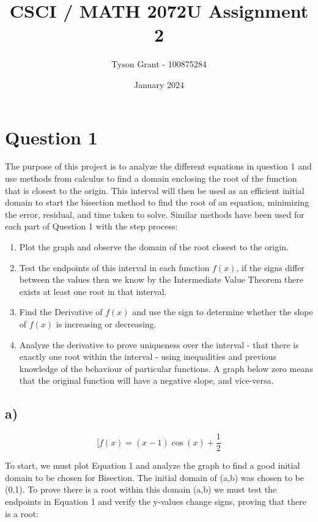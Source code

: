 \documentclass{article}
\title{CSCI / MATH 2072U Assignment 2}
\author{Tyson Grant - 100875284}
\date{January 2024}
\begin{document}
\maketitle

\newpage

\section*{Question 1}
    The purpose of this project is to analyze the different equations in question 1 and use methods from calculus to find a domain enclosing the root of the function that is closest to the origin.  This interval will then be used as an efficient initial domain to start the bisection method to find the root of an equation, minimizing the error, residual, and time taken to solve.  Similar methods have been used for each part of Question 1 with the step process: 
    
    \begin{enumerate}
        \item Plot the graph and observe the domain of the root closest to the origin.
        \item Test the endpoints of this interval in each function $f(x)$, if the signs differ between the values then we know by the Intermediate Value Theorem there exists at least one root in that interval.
        \item Find the Derivative of $f(x)$ and use the sign to determine whether the slope of $f(x)$ is increasing or decreasing.
        \item Analyze the derivative to prove uniqueness over the interval - that there is exactly one root within the interval - using inequalities and previous knowledge of the behaviour of particular functions.  A graph below zero means that the original function will have a negative slope, and vice-versa.
    \end{enumerate}

    
\subsection*{a)}
    \begin{equation}
        [ f(x) = (x-1)\cos(x)+\frac{1}{2}
    \end{equation}

    To start, we must plot Equation 1 and analyze the graph to find a good initial domain to be chosen for Bisection.  The initial domain of (a,b) was chosen to be (0,1). To prove there is a root within this domain (a,b) we must test the endpoints in Equation 1 and verify the y-values change signs, proving that there is a root:
\end{document}
